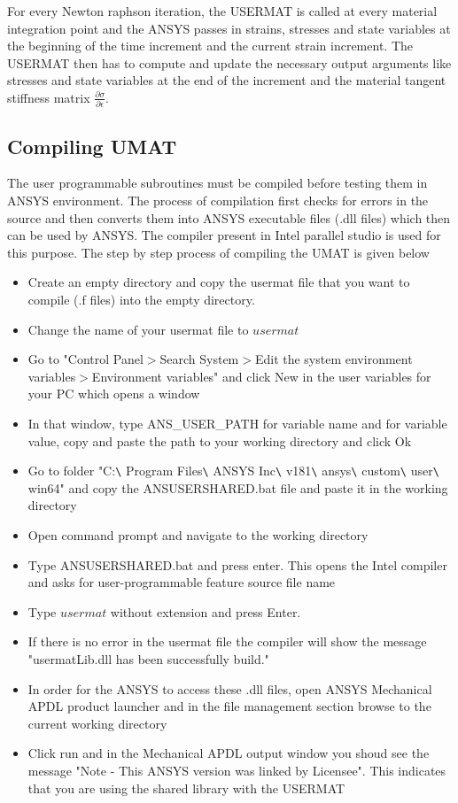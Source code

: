 \documentclass[a4paper,12pt]{extarticle}
\begin{document}
For every Newton raphson iteration, the USERMAT is called at every material integration point and the ANSYS passes in strains, stresses and state variables at the beginning of the time increment and the current strain increment. The USERMAT then has to compute and update the necessary output arguments like stresses and state variables at the end of the increment and the material tangent stiffness matrix $\frac{\partial \sigma}{\partial \epsilon} $.
\vspace*{0.6cm}
\subsection{Compiling UMAT}
\indent\indent\indent The user programmable subroutines must be compiled before testing them in ANSYS environment. The process of compilation first checks for errors in the source and then converts them into ANSYS executable files (.dll files) which then can be used by ANSYS. The compiler present in Intel parallel studio is used for this purpose. The step by step process of compiling the UMAT is given below\\
\begin{itemize}
\item Create an empty directory and copy the usermat file that you want to compile (.f files) into the empty directory.
\item Change the name of your usermat file to $usermat$
\item Go to "Control Panel$>$Search System$>$Edit the system environment variables$>$Environment variables" and click New in the user variables for your PC which opens a window
\item In that window, type ANS\_USER\_PATH for variable name and for variable value, copy and paste the path to your working directory and click Ok
\item Go to folder "C:\texttt{\textbackslash} Program Files\texttt{\textbackslash} ANSYS Inc\texttt{\textbackslash} v181\texttt{\textbackslash} ansys\texttt{\textbackslash} custom\texttt{\textbackslash} user\texttt{\textbackslash} win64" and copy the ANSUSERSHARED.bat file and paste it in the working directory
\item Open command prompt and navigate to the working directory
\item Type ANSUSERSHARED.bat and press enter. This opens the Intel compiler and asks for user-programmable feature source file name
\item Type $usermat$ without extension and press Enter.
\item If there is no error in the usermat file the compiler will show the message "usermatLib.dll has been successfully build."  
\item In order for the ANSYS to access these .dll files, open ANSYS Mechanical APDL product launcher and in the file management section browse to the current working directory
\item Click run and in the Mechanical APDL output window you shoud see the message "Note - This ANSYS version was linked by Licensee". This indicates that you are using the shared library with the USERMAT\\
\end{itemize} 
\end{document}
